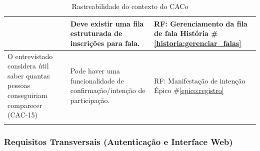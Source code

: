 \documentclass[12pt,a4paper]{article}
\newcounter{epico}
\newcounter{historia}
\begin{document}
\begin{longtable}{|p{7cm}|p{4.5cm}|p{4.5cm}|}
    &Deve existir uma fila estruturada de inscrições para fala. 
    
    & RF: Gerenciamento da fila de fala 
    \newline \newline História \#\ref{historia:gerenciar_falas}\\
    \hline
    O entrevistado considera útil saber quantas pessoas conseguiriam comparecer (CAC-15) 
    
    &Pode haver uma funcionalidade de confirmação/intenção de participação. 
    
    &RF: Manifestação de intenção 
    \newline \newline Épico \#\ref{epico:registro}\\
    \hline
    \caption{Rastreabilidade do contexto do CACo}
\end{longtable}

\subsubsection{Requisitos Transversais (Autenticação e Interface Web)}
\end{document}
